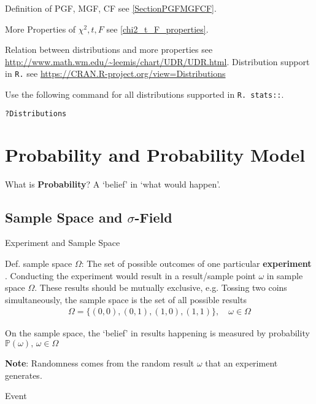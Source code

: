    Definition of PGF, MGF, CF see \autoref{SectionPGFMGFCF}.

    More Properties of $\chi^2,t,F$ see {\autoref{chi2_t_F_properties}}.

    Relation between distributions and more properties see \url{http://www.math.wm.edu/~leemis/chart/UDR/UDR.html}. Distribution support in \lstinline|R.| see \url{https://CRAN.R-project.org/view=Distributions}

Use the following command for all distributions supported in \lstinline|R. stats::|.
\begin{lstlisting}[language=R]
?Distributions
\end{lstlisting}


\section{Probability and Probability Model}

    What is \textbf{Probability}? A `belief' in `what would happen'.


\subsection{Sample Space and $\sigma$-Field}

\begin{point}
    Experiment and Sample Space
\end{point}

    Def. sample space $\Omega$: The set of  possible outcomes of one particular \textbf{experiment} . Conducting the experiment would result in a result/sample point $ \omega  $ in sample space $ \Omega  $. These results should be mutually exclusive, e.g. Tossing two coins simultaneously, the sample space is the set of all possible results
    \begin{align}
        \Omega = \{(0,0),(0,1),(1,0),(1,1)\}, \quad \omega \in \Omega 
    \end{align}

    On the sample space, the `belief' in results happening is measured by probability $ \mathbb{P}\left( \omega  \right),\,\omega \in\Omega   $

    \textbf{Note}: Randomness comes from the random result $ \omega  $ that an experiment generates.
    
\begin{point}
    Event 
\end{point}

